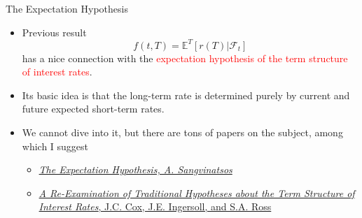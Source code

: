 \documentclass{beamer}
\begin{document}
\begin{frame}{The Expectation Hypothesis}
	\begin{itemize}
		\item Previous result
		\begin{equation*}
			f(t, T) = \mathbb{E}^T[r(T)|\mathcal{F}_t]
		\end{equation*}
		has a nice connection with the \textcolor{red}{expectation hypothesis of the term structure of interest rates}.
		\item Its basic idea is that the long-term rate is determined purely by current and future expected short-term rates.
		\item We cannot dive into it, but there are tons of papers on the subject, among which I suggest
		\begin{itemize}
			\item \href{https://pages.stern.nyu.edu/~sternfin/asangvin/ExpHyp.pdf}{\emph{The Expectation Hypothesis, A. Sangvinatsos}}
			\item \href{https://www.jstor.org/stable/2327547}{\emph{A Re-Examination of Traditional Hypotheses about the Term Structure of Interest Rates}, J.C. Cox, J.E. Ingersoll, and S.A. Ross}
		\end{itemize}
	\end{itemize}
\end{frame}


\end{document}
